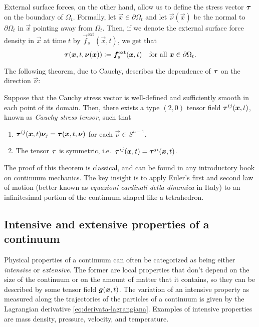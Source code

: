 External surface forces, on the other hand, allow us to define
the stress vector $\bm{\tau}$ on the boundary of $\Omega_t$.
Formally, let $\vec{x} \in \partial \Omega_t$ and let $\vec{\nu}(\vec{x})$
be the normal to $\partial \Omega_t$ in $\vec{x}$ pointing away from $\Omega_t$.
Then, if we denote the external surface force density in $\vec{x}$ at
time $t$ by $\vec{f}_s^{\text{ext}}(\vec{x},t)$, we get that
\begin{equation} \label{eq:sforzo-sul-bordo}
\bm{\tau}(\bm{x},t,\bm{\nu}(\bm{x}))
\vcentcolon= \bm{f}_s^{\text{ext}}(\bm{x},t)
\quad \text{for all $\bm{x} \in \partial \Omega_t$}.
\end{equation}

\noindent The following theorem, due to Cauchy, describes the dependence
of $\bm{\tau}$ on the direction $\vec{\nu}$:
\begin{teor}
Suppose that the Cauchy stress vector is well-defined and sufficiently
smooth in each point of its domain. Then, there exists a type $(2,0)$
tensor field $\bm{\tau}^{ij}(\bm{x},t)$,
known as \emph{Cauchy stress tensor}, such that
\begin{enumerate}
\item $\bm{\tau}^{ij}(\bm{x},t) \bm{\nu}_j = \bm{\tau}(\bm{x},t,\bm{\nu})$
	for each $\vec{\nu} \in S^{n-1}$.
\item The tensor $\bm{\tau}$ is symmetric,
	i.e.\ $\bm{\tau}^{ij}(\bm{x},t) = \bm{\tau}^{ji}(\bm{x},t)$.
\end{enumerate}
\end{teor}

\noindent The proof of this theorem is classical, and can be found
in any introductory book on continuum mechanics.
The key insight is to apply Euler's first and second law of motion
(better known as \emph{equazioni cardinali della dinamica} in Italy)
to an infinitesimal portion of the continuum shaped like a tetrahedron.

\subsection*{Intensive and extensive properties of a continuum}

Physical properties of a continuum can often be categorized as being
either \emph{intensive} or \emph{extensive}. The former are local
properties that don't depend on the size of the continuum or on
the amount of matter that it contains, so they can be described
by some tensor field $\bm{g}(\bm{x},t)$. The variation of an intensive
property as measured along the trajectories of the particles of a continuum
is given by the Lagrangian derivative \eqref{eq:derivata-lagrangiana}.
Examples of intensive properties are mass density, pressure, velocity,
and temperature.

